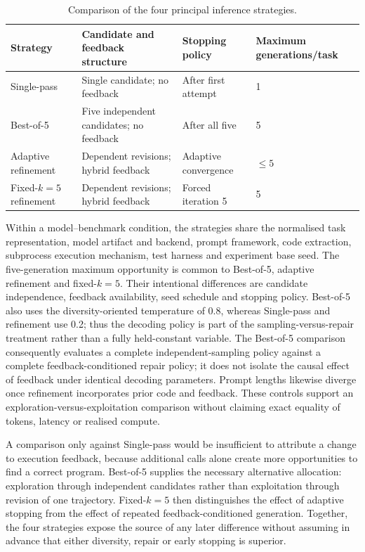 \begin{table}[htbp]
    \centering
    \caption{Comparison of the four principal inference strategies.}
    \label{tab:experimental-strategies}
    \small
    \renewcommand{\arraystretch}{1.15}
    \begin{tabular}{p{} p{} p{} p{}}
        \hline
        \raggedright Strategy & \raggedright Candidate and feedback structure & \raggedright Stopping policy & \raggedright Maximum generations/task \tabularnewline
        \hline
        \raggedright Single-pass & \raggedright Single candidate; no feedback & \raggedright After first attempt & \raggedright 1 \tabularnewline
        \raggedright Best-of-5 & \raggedright Five independent candidates; no feedback & \raggedright After all five & \raggedright 5 \tabularnewline
        \raggedright Adaptive refinement & \raggedright Dependent revisions; hybrid feedback & \raggedright Adaptive convergence & \raggedright $\leq 5$ \tabularnewline
        \raggedright Fixed-$k=5$ refinement & \raggedright Dependent revisions; hybrid feedback & \raggedright Forced iteration 5 & \raggedright 5 \tabularnewline
        \hline
    \end{tabular}
\end{table}

Within a model--benchmark condition, the strategies share the normalised task representation, model artifact and backend, prompt framework, code extraction, subprocess execution mechanism, test harness and experiment base seed. The five-generation maximum opportunity is common to Best-of-5, adaptive refinement and fixed-$k=5$. Their intentional differences are candidate independence, feedback availability, seed schedule and stopping policy. Best-of-5 also uses the diversity-oriented temperature of 0.8, whereas Single-pass and refinement use 0.2; thus the decoding policy is part of the sampling-versus-repair treatment rather than a fully held-constant variable. The Best-of-5 comparison consequently evaluates a complete independent-sampling policy against a complete feedback-conditioned repair policy; it does not isolate the causal effect of feedback under identical decoding parameters. Prompt lengths likewise diverge once refinement incorporates prior code and feedback. These controls support an exploration-versus-exploitation comparison without claiming exact equality of tokens, latency or realised compute.

A comparison only against Single-pass would be insufficient to attribute a change to execution feedback, because additional calls alone create more opportunities to find a correct program. Best-of-5 supplies the necessary alternative allocation: exploration through independent candidates rather than exploitation through revision of one trajectory. Fixed-$k=5$ then distinguishes the effect of adaptive stopping from the effect of repeated feedback-conditioned generation. Together, the four strategies expose the source of any later difference without assuming in advance that either diversity, repair or early stopping is superior.

